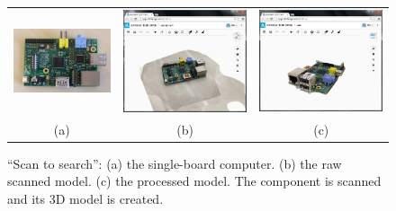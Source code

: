 \begin{figure}
\begin{center}
\begin{tabular}{ccc}   %
   \includegraphics[height=0.23\columnwidth]{input_pi_photo_scantosearch_test}& 
   \includegraphics[height=0.23\columnwidth]{input_pi_rawscanned_scantosearch_test}&
   \includegraphics[height=0.23\columnwidth]{input_pi_scanned_scantosearch_test}\\
   (a) & (b) & (c)
\end{tabular}
\caption{``Scan to search'': (a) the single-board computer. (b) the raw scanned model. (c) the processed model. The component is scanned and its 3D model is created. } 
  \label{scantosearchtest_pi_scanning}
\end{center}
\end{figure}

